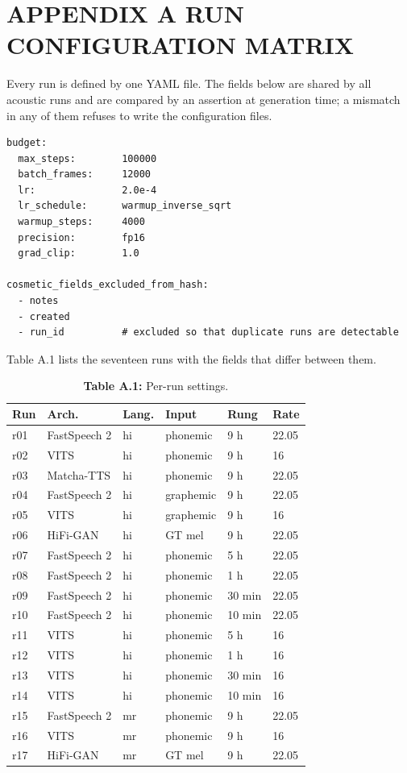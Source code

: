 \documentclass[12pt,a4paper]{article}
\begin{document}
\section*{APPENDIX A  RUN CONFIGURATION MATRIX}
Every run is defined by one YAML file. The fields below are shared by all acoustic runs and are compared by an assertion at generation time; a mismatch in any of them refuses to write the configuration files.

\begin{Verbatim}[fontsize=\small,xleftmargin=1.5em]
budget:
  max_steps:        100000
  batch_frames:     12000
  lr:               2.0e-4
  lr_schedule:      warmup_inverse_sqrt
  warmup_steps:     4000
  precision:        fp16
  grad_clip:        1.0

cosmetic_fields_excluded_from_hash:
  - notes
  - created
  - run_id          # excluded so that duplicate runs are detectable
\end{Verbatim}

Table A.1 lists the seventeen runs with the fields that differ between them.

\begin{table}[htbp]
  \centering
  \footnotesize
  \caption*{\textbf{Table A.1:}  Per-run settings.}
  \begin{tabular}{p{0.58in}p{1.33in}p{0.58in}p{1.13in}p{0.73in}p{0.63in}}
  \toprule
  \textbf{Run} & \textbf{Arch.} & \textbf{Lang.} & \textbf{Input} & \textbf{Rung} & \textbf{Rate} \\
  \midrule
  r01 & FastSpeech 2 & hi & phonemic & 9 h & 22.05 \\
  r02 & VITS & hi & phonemic & 9 h & 16 \\
  r03 & Matcha-TTS & hi & phonemic & 9 h & 22.05 \\
  r04 & FastSpeech 2 & hi & graphemic & 9 h & 22.05 \\
  r05 & VITS & hi & graphemic & 9 h & 16 \\
  r06 & HiFi-GAN & hi & GT mel & 9 h & 22.05 \\
  r07 & FastSpeech 2 & hi & phonemic & 5 h & 22.05 \\
  r08 & FastSpeech 2 & hi & phonemic & 1 h & 22.05 \\
  r09 & FastSpeech 2 & hi & phonemic & 30 min & 22.05 \\
  r10 & FastSpeech 2 & hi & phonemic & 10 min & 22.05 \\
  r11 & VITS & hi & phonemic & 5 h & 16 \\
  r12 & VITS & hi & phonemic & 1 h & 16 \\
  r13 & VITS & hi & phonemic & 30 min & 16 \\
  r14 & VITS & hi & phonemic & 10 min & 16 \\
  r15 & FastSpeech 2 & mr & phonemic & 9 h & 22.05 \\
  r16 & VITS & mr & phonemic & 9 h & 16 \\
  r17 & HiFi-GAN & mr & GT mel & 9 h & 22.05 \\
  \bottomrule
  \end{tabular}
\end{table}
\end{document}
